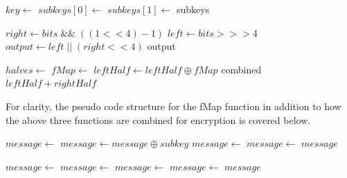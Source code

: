 \documentclass[]{article}
\begin{document}
\begin{algorithmic}
	\State $key\gets $ 
	\State {}
	\State $subkeys[0]\gets $ 
	\State {}
	\State $subkeys[1]\gets $ 
	\State \Return subkeys
\EndFunction
\end{algorithmic}


\vspace{0.5cm}

\begin{algorithmic}
		\State $ right \gets bits \;\&\&\; ( ( 1 << 4 ) - 1 ) $
		\State $ left \gets bits >>> 4 $
		\State $ output \gets left \;||\; ( right << 4 )$
		\State \Return output
	\EndFunction
\end{algorithmic}

\vspace{0.5cm}

\begin{algorithmic}
	
	\State $halves\gets $ 
	\State $fMap \gets $ 	
	\State $ leftHalf \gets leftHalf \oplus fMap $
	\State \Return combined $ leftHalf + rightHalf $
	\EndFunction
\end{algorithmic}

\vspace{0.5cm}
\noindent
For clarity, the pseudo code structure for the fMap function in addition to how the above three functions are combined for encryption is covered below.
\vspace{0.5cm}
\begin{algorithmic}
	
	\State $message\gets $ 
	\State $ message \gets message \oplus subkey $
	\State $ message \gets $ 	
	\State $message\gets $ 	
	\State \Return $message$
	\EndFunction
\end{algorithmic}

\vspace{0.5cm}
\begin{algorithmic}
	
	\State $message\gets $ 
	\State $message\gets $ 
	\State {}	
	\State $message\gets $ 	
	\State $message\gets $ 
	\State \Return $message$
	\EndFunction
\end{algorithmic}
\end{document}

